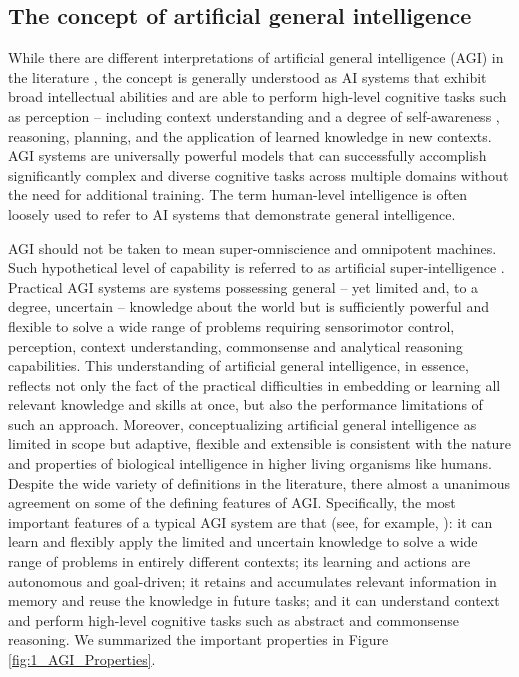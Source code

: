 \documentclass[10pt,journal,compsoc]{IEEEtran}
\begin{document}
	
	\subsection{The concept of artificial general intelligence}
	
	While there are different interpretations of artificial general intelligence (AGI) in the literature \cite{goertzel2014artificial,mclean2023risks,wang2007introduction,fei2022towards,bubeck2023sparks,ilic2024evidence}, the concept is generally understood as AI systems that exhibit broad intellectual abilities and are able to perform high-level cognitive tasks such as perception – including context understanding and a degree of self-awareness \cite{aliman2018hybrid,buttazzo2023rise}, reasoning, planning, and the application of learned knowledge in new contexts.  AGI systems are universally powerful models that can successfully accomplish significantly complex and diverse cognitive tasks across multiple domains without the need for additional training. The term human-level intelligence \cite{adams2012mapping,besold2016generality,mclean2023risks} is often loosely used to refer to AI systems that demonstrate general intelligence. 
	
	
	AGI should not be taken to mean super-omniscience and omnipotent machines. Such hypothetical level of capability is referred to as artificial super-intelligence \cite{pueyo2018growth,bostrom2020ethical}. Practical AGI systems are systems possessing general – yet limited and, to a degree, uncertain – knowledge about the world but is sufficiently powerful and flexible to solve a wide range of problems requiring sensorimotor control, perception, context understanding, commonsense and analytical reasoning capabilities. This understanding of artificial general intelligence, in essence, reflects not only the fact of the practical difficulties in embedding or learning all relevant knowledge and skills at once, but also the performance limitations of such an approach. Moreover, conceptualizing artificial general intelligence as limited in scope but adaptive, flexible and extensible is consistent with the nature and properties of biological intelligence in higher living organisms like humans. Despite the wide variety of definitions in the literature, there almost a unanimous agreement on some of the defining features of AGI. Specifically, the most important features of a typical AGI system are that (see, for example, \cite{goertzel2014artificial,bubeck2023sparks,adams2012mapping,pennachin2007contemporary,voss2007essentials}): it can learn and flexibly apply the limited and uncertain knowledge to solve a wide range of problems in entirely different contexts; its learning and actions are autonomous and goal-driven; it retains and accumulates relevant information in memory and reuse the knowledge in future tasks; and it can understand context and perform high-level cognitive tasks such as abstract and commonsense reasoning. We summarized the important properties in Figure \ref{fig:1_AGI_Properties}.
	
\end{document}

